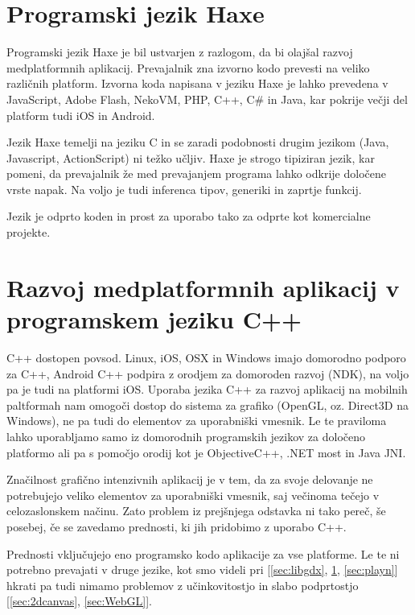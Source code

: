 \section{Programski jezik Haxe}
\label{sec:haxe}

Programski jezik Haxe \cite{haxe} je bil ustvarjen z razlogom, da bi olajšal razvoj medplatformnih aplikacij. Prevajalnik zna izvorno kodo prevesti na veliko različnih platform. Izvorna koda napisana v jeziku Haxe je lahko prevedena v JavaScript, Adobe Flash, NekoVM, PHP, C++, C\# in Java, kar pokrije večji del platform tudi iOS in Android.

Jezik Haxe temelji na jeziku C in se zaradi podobnosti drugim jezikom (Java, Javascript, ActionScript) ni težko učljiv. Haxe je strogo tipiziran jezik, kar pomeni, da prevajalnik že med prevajanjem programa lahko odkrije določene vrste napak. Na voljo je tudi inferenca tipov, generiki in zaprtje funkcij. 

Jezik je odprto koden in prost za uporabo tako za odprte kot komercialne projekte.

\section{Razvoj medplatformnih aplikacij v programskem jeziku C++}

C++ dostopen povsod. Linux, iOS, OSX in Windows imajo domorodno podporo za C++, Android C++ podpira z orodjem za domoroden razvoj (NDK), na voljo pa je tudi na platformi iOS. Uporaba jezika C++ za razvoj aplikacij na mobilnih paltformah nam omogoči dostop do sistema za grafiko (OpenGL, oz. Direct3D na Windows), ne pa tudi do elementov za uporabniški vmesnik. Le te praviloma lahko uporabljamo samo iz domorodnih programskih jezikov za določeno platformo ali pa s pomočjo orodij kot je ObjectiveC++, .NET most in Java JNI.

Značilnost grafično intenzivnih aplikacij je v tem, da za svoje delovanje ne potrebujejo veliko elementov za uporabniški vmesnik, saj večinoma tečejo v celozaslonskem načinu. Zato problem iz prejšnjega odstavka ni tako pereč, še posebej, če se zavedamo prednosti, ki jih pridobimo z uporabo C++. 

Prednosti vključujejo eno programsko kodo aplikacije za vse platforme. Le te ni potrebno prevajati v druge jezike, kot smo videli pri [\ref{sec:libgdx}, \ref{sec:haxe}, \ref{sec:playn}] hkrati pa tudi nimamo problemov z učinkovitostjo in slabo podprtostjo [\ref{sec:2dcanvas}, \ref{sec:WebGL}].

